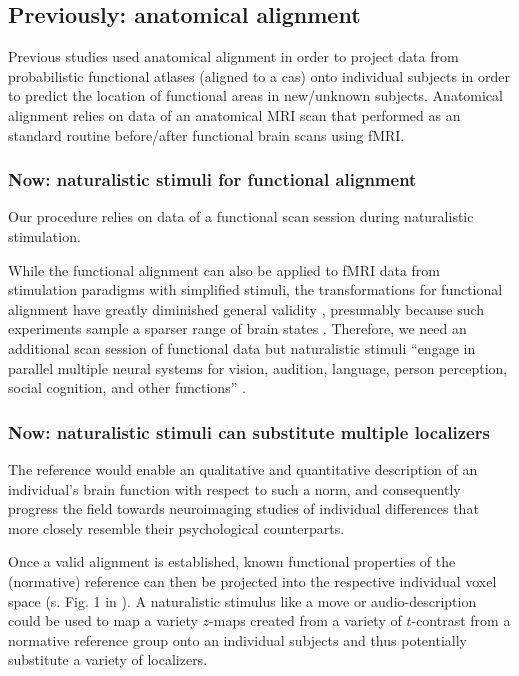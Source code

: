 

\subsection{Previously: anatomical alignment}
%
Previous studies used anatomical alignment in order to project data from
probabilistic functional atlases (aligned to a \ac{cas}) onto individual
subjects in order to predict the location of functional areas in new/unknown
subjects.
%
Anatomical alignment relies on data of an anatomical MRI scan that performed as
an standard routine before/after functional brain scans using fMRI.


\subsubsection{Now: naturalistic stimuli for functional alignment}
%
Our procedure relies on data of a functional scan session during naturalistic
stimulation.

%
While the functional alignment can also be applied to fMRI data from stimulation
paradigms with simplified stimuli, the transformations for functional alignment
have greatly diminished general validity \citep{haxby2011common}, presumably
because such experiments sample a sparser range of brain states
\citep{guntupalli2016model}.
%
Therefore, we need an additional scan session of functional data but
naturalistic stimuli ``engage in parallel multiple neural systems for vision,
audition, language, person perception, social cognition, and other functions''
\citep{jiahui2020predicting}.


\subsubsection{Now: naturalistic stimuli can substitute multiple localizers}
%
The reference would enable an qualitative and quantitative description of an
individual's brain function with respect to such a norm, and consequently
progress the field towards neuroimaging studies of individual differences that
more closely resemble their psychological counterparts.

%
Once a valid alignment is established, known functional properties of the
(normative) reference can then be projected into the respective individual voxel
space (s. Fig. 1 in \citep{nishimoto2016lining}).
%
A naturalistic stimulus like a move or audio-description could be used to map a
variety $z$-maps created from a variety of $t$-contrast from a normative
reference group onto an individual subjects and thus potentially substitute a
variety of localizers.


